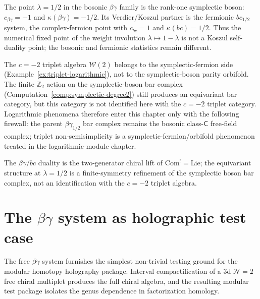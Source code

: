 \begin{remark}
\label{rem:symplectic-logarithmic}
The point $\lambda=1/2$ in the bosonic $\beta\gamma$ family is the
rank-one symplectic boson: $c_{\beta\gamma}=-1$ and
$\kappa(\beta\gamma)=-1/2$. Its Verdier/Koszul partner is the
fermionic $bc_{1/2}$ system, the complex-fermion point with
$c_{bc}=1$ and $\kappa(bc)=1/2$. Thus the numerical fixed point of
the weight involution $\lambda\mapsto1-\lambda$ is not a
Koszul self-duality point; the bosonic and fermionic statistics remain
different.

The $c=-2$ triplet algebra $\mathcal W(2)$ belongs to the
symplectic-fermion side
\textup{(}Example~\ref{ex:triplet-logarithmic}\textup{)}, not to the
symplectic-boson parity orbifold. The finite
$\mathbb Z_2$ action on the symplectic-boson bar complex
\textup{(}Computation~\ref{comp:symplectic-degree2}\textup{)} still
produces an equivariant bar category, but this category is not
identified here with the $c=-2$ triplet category. Logarithmic
phenomena therefore enter this chapter only with the following
firewall: the parent $\beta\gamma_{1/2}$ bar complex remains the
bosonic class-$\mathsf C$ free-field complex; triplet
non-semisimplicity is a symplectic-fermion/orbifold phenomenon treated
in the logarithmic-module chapter.
\end{remark}

The $\beta\gamma/bc$ duality is the two-generator chiral lift of
$\mathrm{Com}^! = \mathrm{Lie}$; the equivariant structure at
$\lambda = 1/2$ is a finite-symmetry refinement of the symplectic
boson bar complex, not an identification with the $c=-2$ triplet
algebra.

\section{The \texorpdfstring{$\beta\gamma$}{beta-gamma} system as holographic test case}
\label{sec:betagamma-holographic}

The free $\beta\gamma$ system furnishes the simplest non-trivial testing
ground for the modular homotopy holography package. Interval
compactification of a 3d $\mathcal{N}=2$ free chiral multiplet
produces the full chiral algebra, and the resulting modular test
package isolates the genus dependence in factorization homology.

